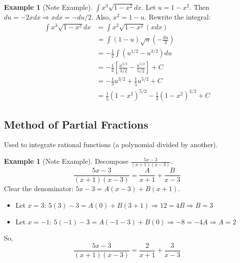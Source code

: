 \documentclass[11pt, a4paper]{article}
\theoremstyle{definition}
\newtheorem{example}[theorem]{Example}
\begin{document}
\begin{example}[Note Example]
$\int x^3 \sqrt{1-x^2} dx$.
Let $u = 1-x^2$. Then $du = -2x dx \Rightarrow x dx = -du/2$. Also, $x^2 = 1-u$.
Rewrite the integral:
\begin{align*}
    \int x^3 \sqrt{1-x^2} dx &= \int x^2 \sqrt{1-x^2} (x dx) \\
    &= \int (1-u) \sqrt{u} \left(-\frac{du}{2}\right) \\
    &= -\frac{1}{2} \int (u^{1/2} - u^{3/2}) du \\
    &= -\frac{1}{2} \left[ \frac{u^{3/2}}{3/2} - \frac{u^{5/2}}{5/2} \right] + C \\
    &= -\frac{1}{3}u^{3/2} + \frac{1}{5}u^{5/2} + C \\
    &= \frac{1}{5}(1-x^2)^{5/2} - \frac{1}{3}(1-x^2)^{3/2} + C
\end{align*}
\end{example}

\subsection{Method of Partial Fractions}
Used to integrate rational functions (a polynomial divided by another).
\begin{example}[Note Example]
Decompose $\frac{5x-3}{(x+1)(x-3)}$.
\[
\frac{5x-3}{(x+1)(x-3)} = \frac{A}{x+1} + \frac{B}{x-3}
\]
Clear the denominator: $5x-3 = A(x-3) + B(x+1)$.
\begin{itemize}
    \item Let $x=3$: $5(3)-3 = A(0) + B(3+1) \Rightarrow 12 = 4B \Rightarrow B=3$
    \item Let $x=-1$: $5(-1)-3 = A(-1-3) + B(0) \Rightarrow -8 = -4A \Rightarrow A=2$
\end{itemize}
So,
\[
\frac{5x-3}{(x+1)(x-3)} = \frac{2}{x+1} + \frac{3}{x-3}
\]
\end{example}
\end{document}
